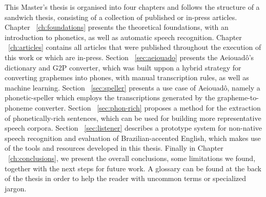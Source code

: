 This Master's thesis is organised into four chapters and follows the structure of a sandwich thesis, consisting of a collection of published or in-press articles. Chapter ~\ref{ch:foundations} presents the theoretical foundations, with an introduction to phonetics, as well as automatic speech recognition. Chapter ~\ref{ch:articles} contains all articles that were published throughout the execution of this work or which are in-press. Section ~\ref{sec:aeiouado} presents the Aeiouad\^o's dictionary and \ac{G2P} converter, which was built uppon a hybrid strategy for converting graphemes into phones, with manual transcription rules, as well as machine learning. Section ~\ref{sec:speller} presents a use case of Aeiouad\^o, namely a phonetic-speller which employs the transcriptions generated by the grapheme-to-phoneme converter. Section ~\ref{sec:phon-rich} proposes a method for the extraction of phonetically-rich sentences, which can be used for building more representative speech corpora. Section ~\ref{sec:listener} describes a prototype system for non-native speech recognition and evaluation of Brazilian-accented English, which makes use of the tools and resources developed in this thesis. Finally in Chapter ~\ref{ch:conclusions}, we present the overall conclusions, some limitations we found, together with the next steps for future work. A glossary can be found at the back of the thesis in order to help the reader with uncommon terms or specialized jargon.